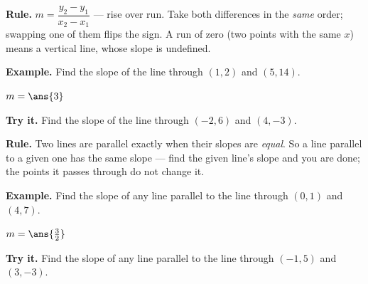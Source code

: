 \documentclass[12pt]{article}
\begin{document}


\begin{formulabox}
\textbf{Rule.} $m = \dfrac{y_2-y_1}{x_2-x_1}$ --- rise over run. Take both
differences in the \emph{same} order; swapping one of them flips the sign. A run
of zero (two points with the same $x$) means a vertical line, whose slope is
undefined.
\end{formulabox}

\begin{examplebox}
\textbf{Example.} Find the slope of the line through $(1,2)$ and $(5,14)$.

$m = \ans{3}$
\end{examplebox}

\begin{tryitbox}
\textbf{Try it.} Find the slope of the line through $(-2,6)$ and $(4,-3)$.\\[2pt]
\end{tryitbox}


\begin{formulabox}
\textbf{Rule.} Two lines are parallel exactly when their slopes are
\emph{equal}. So a line parallel to a given one has the same slope --- find the
given line's slope and you are done; the points it passes through do not change
it.
\end{formulabox}

\begin{examplebox}
\textbf{Example.} Find the slope of any line parallel to the line through
$(0,1)$ and $(4,7)$.

$m = \ans{\tfrac{3}{2}}$
\end{examplebox}

\begin{tryitbox}
\textbf{Try it.} Find the slope of any line parallel to the line through
$(-1,5)$ and $(3,-3)$.\\[2pt]
\end{tryitbox}
\end{document}
